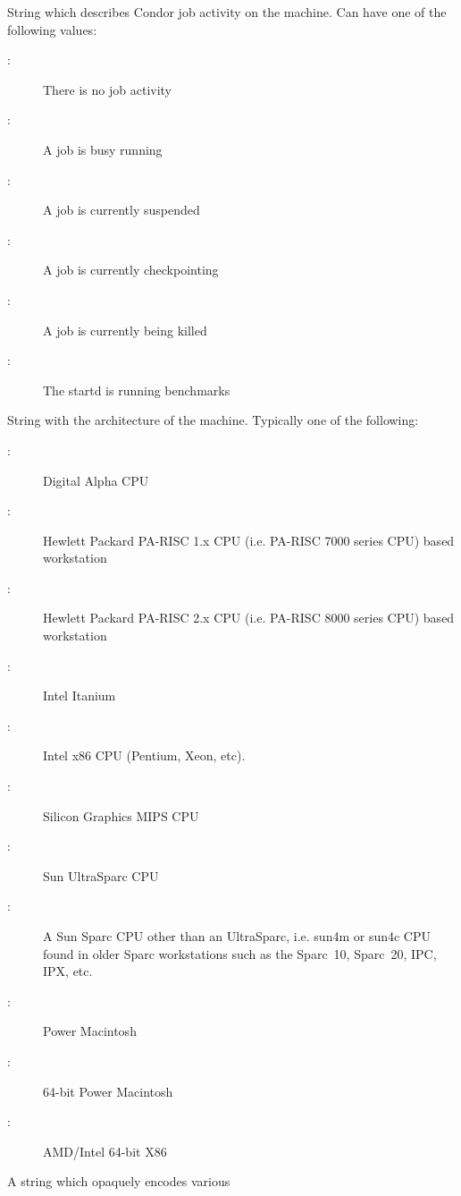 \begin{description}
%
\item[\AdAttr{Activity}:] String which describes Condor job activity on the machine.
Can have one of the following values:
	\begin{description}
	\item[:] There is no job activity
	\item[:] A job is busy running
	\item[:] A job is currently suspended
	\item[:] A job is currently checkpointing
	\item[:] A job is currently being killed
	\item[:] The startd is running benchmarks
	\end{description}
%
\item[\AdAttr{Arch}:] String with the architecture of the machine.  Typically
one of the following: 
	\begin{description}
	\item[:] Digital Alpha CPU
	\item[:] Hewlett Packard PA-RISC 1.x CPU (i.e. PA-RISC    
                      7000 series CPU) based workstation
	\item[:] Hewlett Packard PA-RISC 2.x CPU (i.e. PA-RISC    
                      8000 series CPU) based workstation
	\item[:] Intel Itanium
	\item[:] Intel x86 CPU (Pentium, Xeon, etc).
	\item[:] Silicon Graphics MIPS CPU
	\item[:] Sun UltraSparc CPU
	\item[:] A Sun Sparc CPU other than an UltraSparc, i.e.
sun4m or sun4c CPU found in older Sparc workstations such as the Sparc~10, 
Sparc~20, IPC, IPX, etc.
	\item[:] Power Macintosh
	\item[:] 64-bit Power Macintosh
	\item[:] AMD/Intel 64-bit X86
	\end{description}
%
\item[\AdAttr{CheckpointPlatform}:] A string which opaquely encodes various

\end{description}
